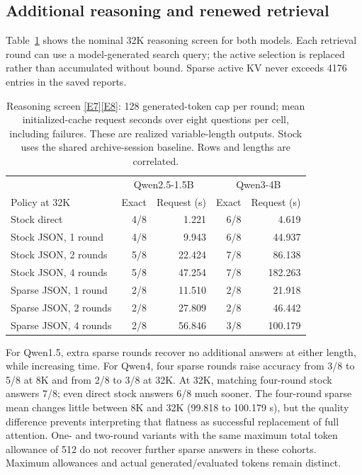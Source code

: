 \documentclass[11pt,letterpaper]{article}
\newcommand{\ev}[1]{\hyperref[app:evidence]{[E#1]}}
\begin{document}
\subsection{Additional reasoning and renewed retrieval}
Table~\ref{tab:reason} shows the nominal 32K reasoning screen for both models. Each retrieval round can use a model-generated search query; the active selection is replaced rather than accumulated without bound. Sparse active KV never exceeds 4176 entries in the saved reports.

\begin{table}[ht]
\centering\small
\begin{tabular}{lrrrr}
\toprule
 & \multicolumn{2}{c}{Qwen2.5-1.5B} & \multicolumn{2}{c}{Qwen3-4B}\\
Policy at 32K & Exact & Request (s) & Exact & Request (s)\\\midrule
Stock direct & 4/8 & 1.221 & 6/8 & 4.619\\
Stock JSON, 1 round & 4/8 & 9.943 & 6/8 & 44.937\\
Stock JSON, 2 rounds & 5/8 & 22.424 & 7/8 & 86.138\\
Stock JSON, 4 rounds & 5/8 & 47.254 & 7/8 & 182.263\\
Sparse JSON, 1 round & 2/8 & 11.510 & 2/8 & 21.918\\
Sparse JSON, 2 rounds & 2/8 & 27.809 & 2/8 & 46.442\\
Sparse JSON, 4 rounds & 2/8 & 56.846 & 3/8 & 100.179\\\bottomrule
\end{tabular}
\caption{Reasoning screen \ev{7}\ev{8}: 128 generated-token cap per round; mean initialized-cache request seconds over eight questions per cell, including failures. These are realized variable-length outputs. Stock uses the shared archive-session baseline. Rows and lengths are correlated.}\label{tab:reason}
\end{table}

For Qwen1.5, extra sparse rounds recover no additional answers at either length, while increasing time. For Qwen4, four sparse rounds raise accuracy from 3/8 to 5/8 at 8K and from 2/8 to 3/8 at 32K. At 32K, matching four-round stock answers 7/8; even direct stock answers 6/8 much sooner. The four-round sparse mean changes little between 8K and 32K (99.818 to 100.179 s), but the quality difference prevents interpreting that flatness as successful replacement of full attention. One- and two-round variants with the same maximum total token allowance of 512 do not recover further sparse answers in these cohorts. Maximum allowances and actual generated/evaluated tokens remain distinct.
\end{document}
